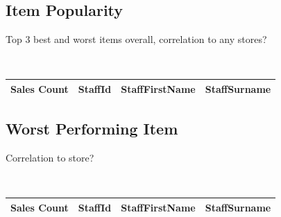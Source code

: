 \documentclass{article}
\begin{document}
            \subsection{Item Popularity}
                Top 3 best and worst items overall, correlation to any stores?

                \begin{lstlisting}
                   
                \end{lstlisting}

                \begin{table}[H]
                    \centering
                    \begin{tabular}{|l|l|l|l|}
                    \hline
                    Sales Count & StaffId & StaffFirstName & StaffSurname \\ \hline
                    \end{tabular}
                    \end{table}

            \subsection{Worst Performing Item}
                Correlation to store?

                \begin{lstlisting}
                    
                \end{lstlisting}

                \begin{table}[H]
                    \centering
                    \begin{tabular}{|l|l|l|l|}
                    \hline
                    Sales Count & StaffId & StaffFirstName & StaffSurname \\ \hline
                    \end{tabular}
                    \end{table}




	\newpage
\end{document}
